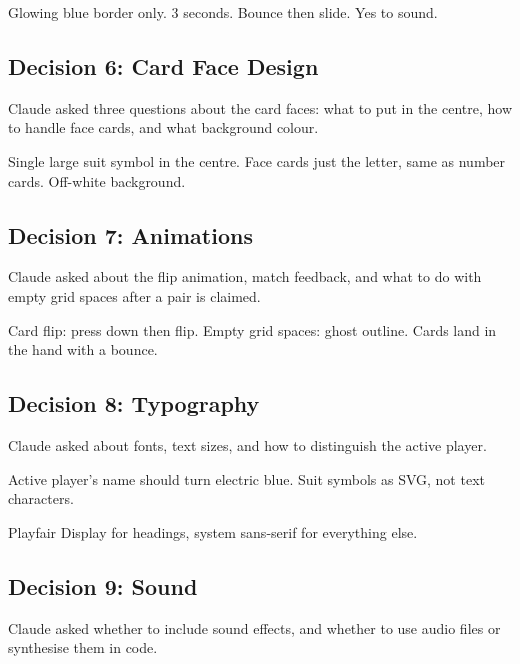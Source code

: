 \documentclass[11pt,a4paper]{article}
\begin{document}
\begin{tcolorbox}[promptbox]
Glowing blue border only. 3 seconds. Bounce then slide. Yes to sound.
\end{tcolorbox}

\subsection{Decision 6: Card Face Design}

Claude asked three questions about the card faces: what to put in the centre, how to handle face cards, and what background colour.

\begin{tcolorbox}[promptbox]
Single large suit symbol in the centre. Face cards just the letter, same as number cards. Off-white background.
\end{tcolorbox}

\subsection{Decision 7: Animations}

Claude asked about the flip animation, match feedback, and what to do with empty grid spaces after a pair is claimed.

\begin{tcolorbox}[promptbox]
Card flip: press down then flip. Empty grid spaces: ghost outline. Cards land in the hand with a bounce.
\end{tcolorbox}

\subsection{Decision 8: Typography}

Claude asked about fonts, text sizes, and how to distinguish the active player.

\begin{tcolorbox}[promptbox]
Active player's name should turn electric blue. Suit symbols as SVG, not text characters.
\end{tcolorbox}

Playfair Display for headings, system sans-serif for everything else.

\subsection{Decision 9: Sound}

Claude asked whether to include sound effects, and whether to use audio files or synthesise them in code.
\end{document}
